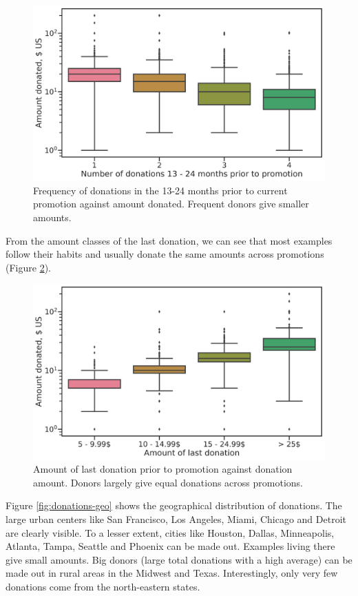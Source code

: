 \documentclass[
  11pt,
  a4paper,
  DIV=12,captions=tableheading,oneside,titlepage=firstiscover,abstracton]{scrreprt}
\begin{document}
\begin{figure}

{\centering \includegraphics[width=0.6\linewidth]{figures/eda/frequency-past-donatios-vs-donations} 

}

\caption{Frequency of donations in the 13-24 months prior to current promotion against amount donated. Frequent donors give smaller amounts.}\label{fig:rfa-f}
\end{figure}

From the amount classes of the last donation, we can see that most examples follow their habits and usually donate the same amounts across promotions (Figure \ref{fig:rfa-a}).

\begin{figure}

{\centering \includegraphics[width=0.6\linewidth]{figures/eda/amount-past-donatios-vs-donations} 

}

\caption{Amount of last donation prior to promotion against donation amount. Donors largely give equal donations across promotions.}\label{fig:rfa-a}
\end{figure}

Figure \ref{fig:donations-geo} shows the geographical distribution of donations. The large urban centers like San Francisco, Los Angeles, Miami, Chicago and Detroit are clearly visible. To a lesser extent, cities like Houston, Dallas, Minneapolis, Atlanta, Tampa, Seattle and Phoenix can be made out. Examples living there give small amounts. Big donors (large total donations with a high average) can be made out in rural areas in the Midwest and Texas. Interestingly, only very few donations come from the north-eastern states.
\end{document}
